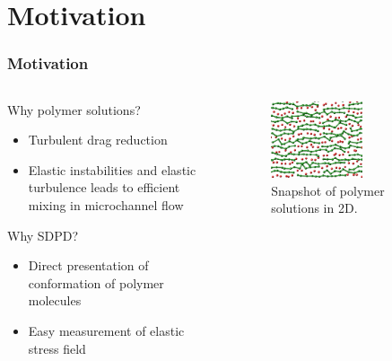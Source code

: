 \section[Motivation]{Motivation}
\begin{frame}
  \frametitle{Motivation}
  \begin{columns}
    \begin{column}{0.5\textwidth}
      \begin{block}{Why polymer solutions?}
        \begin{itemize}
        \item Turbulent drag reduction
        \item Elastic instabilities and elastic turbulence leads to efficient mixing in microchannel flow
        \end{itemize}
      \end{block}
      \begin{block}{Why SDPD?}
        \begin{itemize} 
        \item Direct presentation of conformation of polymer molecules
        \item Easy measurement of elastic stress field
        \end{itemize}
      \end{block}

    \end{column}
    \begin{column}{0.5\textwidth}
\begin{figure}[t]
    \centering
    \includegraphics[width=0.6\textwidth]{img/polymers.png}
    \caption{Snapshot of polymer solutions in 2D.}
    \label{fig:snap}
  \end{figure}
    \end{column}
  \end{columns}
\end{frame}

